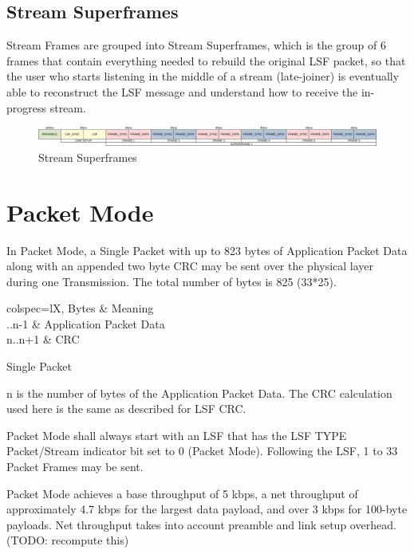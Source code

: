 \documentclass[a4paper,11pt,oneside]{book}
\begin{document}
\subsection{Stream Superframes}

Stream Frames are grouped into Stream Superframes, which is the group of 6 frames that contain everything needed to rebuild the original LSF packet, so that the user who starts listening in the middle of a stream (late-joiner) is eventually able to reconstruct the LSF message and understand how to receive the in-progress stream.

\begin{figure}[H]
	\centering
	\includegraphics[width=\linewidth]{img/M17_stream}
	\caption{Stream Superframes}
	\label{fig:m17stream}
\end{figure}

\section{Packet Mode}

In Packet Mode, a Single Packet with up to 823 bytes of Application Packet Data along with an appended two byte CRC may be sent over the physical layer during one Transmission. The total number of bytes is 825 (33*25).

\begin{table}[H]
	\centering
	\begin{tblr}{
		colspec={lX},
		}
		\hline
		Bytes & Meaning \\
		..n-1 & Application Packet Data \\
		n..n+1 & CRC \\
		\hline[2px]
	\end{tblr}
	\caption{Single Packet}
\end{table}

n is the number of bytes of the Application Packet Data. The CRC calculation used here is the same as described for LSF CRC.

Packet Mode shall always start with an LSF that has the LSF TYPE Packet/Stream indicator bit set to 0 (Packet Mode). Following the LSF, 1 to 33 Packet Frames may be sent.

Packet Mode achieves a base throughput of 5 kbps, a net throughput of approximately 4.7 kbps for the largest data payload, and over 3 kbps for 100-byte payloads. Net throughput takes into account preamble and link setup overhead. (TODO: recompute this)
\end{document}

